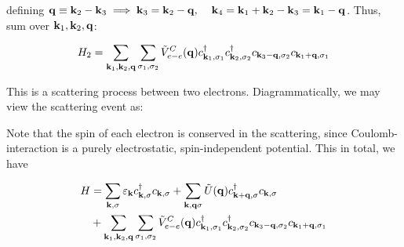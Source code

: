 defining $\vb{q} \equiv \vb{k}_2- \vb{k}_3 \implies \vb{k}_3 =  \vb{k}_2-\vb{q}, \hspace{0.4cm} \vb{k}_4 = \vb{k}_1 + \vb{k}_2-\vb{k}_3 = \vb{k}_1- \vb{q}$.
Thus, sum over $\vb{k}_1, \vb{k}_2, \vb{q}$:

\begin{align*}
	H_2 = \sum_{\vb{k}_1,\vb{k}_2,\vb{q} } \sum_{\sigma_1, \sigma_2} \tilde{V}_{e-e}^C (\vb{q}) c^{\dagger}_{ \vb{k}_1, \sigma_1} c^{\dagger}_{ \vb{k}_2, \sigma_2}  c_{ \vb{k}_3-\vb{q}, \sigma_2} c_{ \vb{k}_1+\vb{q}, \sigma_1}
\end{align*}

\noindent This is a scattering process between two electrons. 
\noindent Diagrammatically, we may view the scattering event as: 


\begin{center}
\end{center}

\noindent Note that the spin of each electron is conserved in the scattering, since Coulomb-interaction is a purely electrostatic, spin-independent potential. This in total, we have

\begin{align*}
	H &= \sum_{\vb{k}, \sigma} \varepsilon_{\vb{k}} c^{\dagger}_{ \vb{k}, \sigma} c_{\vb{k}, \sigma} +  \sum_{\vb{k}, \vb{q} \sigma} \tilde{U}(\vb{q}) c^{\dagger}_{ \vb{k}+\vb{q}, \sigma}c_{\vb{k}, \sigma}\\
	& +  \sum_{\vb{k}_1,\vb{k}_2,\vb{q} } \sum_{\sigma_1, \sigma_2} \tilde{V}_{e-e}^C (\vb{q}) c^{\dagger}_{ \vb{k}_1, \sigma_1} c^{\dagger}_{ \vb{k}_2, \sigma_2}  c_{ \vb{k}_3-\vb{q}, \sigma_2} c_{ \vb{k}_1+\vb{q}, \sigma_1}
\end{align*}

